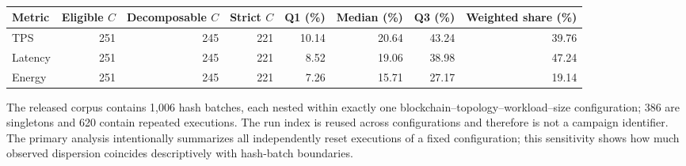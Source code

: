 \begin{table}[t]
\centering
\caption{}
\label{tab:campaign_hash_sensitivity}
\TableFont
\setlength{\tabcolsep}{2pt}
\begin{tabular}{lrrrrrrr}
\hline
Metric & Eligible $C$ & Decomposable $C$ & Strict $C$ & Q1 (\%) & Median (\%) & Q3 (\%) & Weighted share (\%) \\
\hline
TPS & 251 & 245 & 221 & 10.14 & 20.64 & 43.24 & 39.76 \\
Latency & 251 & 245 & 221 & 8.52 & 19.06 & 38.98 & 47.24 \\
Energy & 251 & 245 & 221 & 7.26 & 15.71 & 27.17 & 19.14 \\
\hline
\end{tabular}
\vspace{1mm}
\parbox{\textwidth}{\TableFont The released corpus contains 1,006 hash batches, each nested within exactly one blockchain--topology--workload--size configuration; 386 are singletons and 620 contain repeated executions. The run index is reused across configurations and therefore is not a campaign identifier. The primary analysis intentionally summarizes all independently reset executions of a fixed configuration; this sensitivity shows how much observed dispersion coincides descriptively with hash-batch boundaries.}
\end{table}
